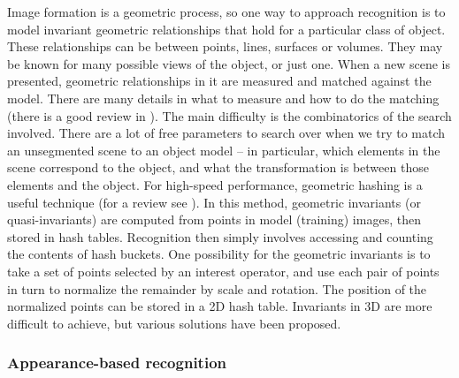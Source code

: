 Image formation is a geometric process, so one way to approach 
recognition is to model invariant geometric relationships that
hold for a particular class of object.  These relationships
can be between points, lines, surfaces or volumes.
%
They may be known for many possible views of the object, or just one.
When a new scene is presented, geometric relationships in it
are measured and matched against the model.
%
There are many details in what to measure and how to do the matching
(there is a good review in \cite{selinger01analysis}).
%
The main difficulty is the combinatorics of the search involved.
There are a lot of free parameters to search over when we try to
match an unsegmented scene to an object model -- in particular,
which elements in the scene correspond to the object, and 
what the transformation is between those elements and the object.
%
For high-speed performance, geometric hashing is a useful technique
(for a review see \cite{wolfson97geometric}).  In this method,
geometric invariants (or quasi-invariants) are computed from points in
model (training) images, then stored in hash tables.  Recognition then
simply involves accessing and counting the contents of hash buckets.
%
One possibility for the geometric invariants is to take a set of
points selected by an interest operator, and use each pair of points
in turn to normalize the remainder by scale and rotation.  The
position of the normalized points can be stored in a 2D hash table.
Invariants in 3D are
more difficult to achieve, but various solutions have been proposed.

\subsubsection*{Appearance-based recognition}

